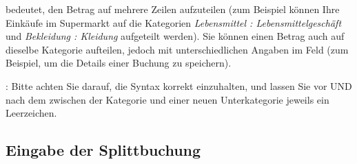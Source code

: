  bedeutet, den Betrag auf mehrere Zeilen aufzuteilen (zum Beispiel können Ihre Einkäufe im Supermarkt auf die Kategorien \emph{Lebensmittel : Lebensmittelgeschäft} und \emph{Bekleidung : Kleidung} aufgeteilt werden). Sie können einen Betrag auch auf dieselbe Kategorie aufteilen, jedoch mit unterschiedlichen Angaben im Feld  (zum Beispiel, um die Details einer Buchung zu speichern).

\Note{}: Bitte achten Sie darauf, die Syntax korrekt einzuhalten, und lassen Sie vor UND nach dem \dequote{:} zwischen der Kategorie und einer neuen Unterkategorie jeweils ein Leerzeichen.


\subsection{Eingabe der Splittbuchung\label{transactions-breakdown-master}}

